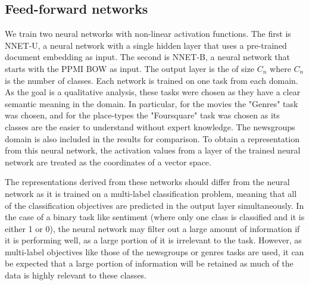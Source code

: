 




\subsection{Feed-forward networks}

We train two neural networks with non-linear activation functions. The first is NNET-U, a neural network with a single hidden layer that uses a pre-trained document embedding as input. The second is NNET-B, a neural network that starts with the PPMI BOW as input. The output layer is the of size $C_n$ where $C_n$ is the number of classes. Each network is trained on one task from each domain. As the goal is a qualitative analysis, these tasks were chosen as they have a clear semantic meaning in the domain. In particular, for the movies the "Genres" task was chosen, and for the place-types the "Foursquare" task was chosen as its classes are the easier to understand without expert knowledge. The newsgroups domain is also included in the results for comparison. To obtain a representation from this neural network, the activation values from a layer of the trained neural network are treated as the coordinates of a vector space.

The representations derived from these networks should differ from the  neural network as it is trained on a multi-label classification problem, meaning that all of the classification objectives are predicted in the output layer simultaneously. In the case of a binary task like sentiment (where only one class is classified and it is either 1 or 0),  the neural network may filter out a large amount of information if it is performing well, as a large portion of it is irrelevant to the task. However, as multi-label objectives like those of the newsgroups or genres tasks are used, it can be expected that a large portion of information will be retained as much of the data is highly relevant to these classes. 


